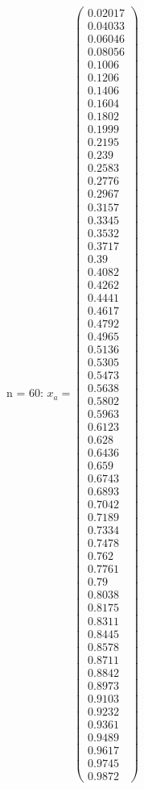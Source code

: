 \documentclass{udpreport}
\begin{document}
\begin{enumerate}
\begin {enumerate}
\begin{enumerate}
\begin{itemize}
\begin{itemize}
				n = 60: $x_{a} =\left(\begin{array}{c} 0.02017\\ 0.04033\\ 0.06046\\ 0.08056\\ 0.1006\\ 0.1206\\ 0.1406\\ 0.1604\\ 0.1802\\ 0.1999\\ 0.2195\\ 0.239\\ 0.2583\\ 0.2776\\ 0.2967\\ 0.3157\\ 0.3345\\ 0.3532\\ 0.3717\\ 0.39\\ 0.4082\\ 0.4262\\ 0.4441\\ 0.4617\\ 0.4792\\ 0.4965\\ 0.5136\\ 0.5305\\ 0.5473\\ 0.5638\\ 0.5802\\ 0.5963\\ 0.6123\\ 0.628\\ 0.6436\\ 0.659\\ 0.6743\\ 0.6893\\ 0.7042\\ 0.7189\\ 0.7334\\ 0.7478\\ 0.762\\ 0.7761\\ 0.79\\ 0.8038\\ 0.8175\\ 0.8311\\ 0.8445\\ 0.8578\\ 0.8711\\ 0.8842\\ 0.8973\\ 0.9103\\ 0.9232\\ 0.9361\\ 0.9489\\ 0.9617\\ 0.9745\\ 0.9872 \end{array}\right)$

\end{itemize}
\end{itemize}
\end{enumerate}
\end{enumerate}
\end{enumerate}
\end{document}
